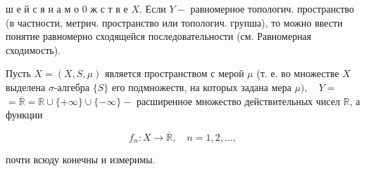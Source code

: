 \documentclass[10pt]{article}
\begin{document}
ш е й с я н а м о 0 ж с т в е $X$. Если $Y-$ равномерное топологич. пространство (в частности, метрич. пространство или топологич. групша), то можно ввести понятие равномерно сходящейся последовательности (см. Равномерная сходимость).



Пусть $X=(X, S, \mu)$ является пространством с мерой $\mu$ (т. е. во множестве $X$ выделена $\sigma$-алгебра $\{S\}$ его подмножеств, на которых задана мера $\mu), \quad Y=$ $=\overline{\mathbb{R}}=\mathbb{R} \cup\{+\infty\} \cup\{-\infty\}-$ расширенное множество действительных чисел $\mathbb{R}$, а функции



\[

f_{n}: X \longrightarrow \overline{\mathbb{R}}, \quad n=1,2, \ldots,

\]



почти всюду конечны и измеримы.
\end{document}
